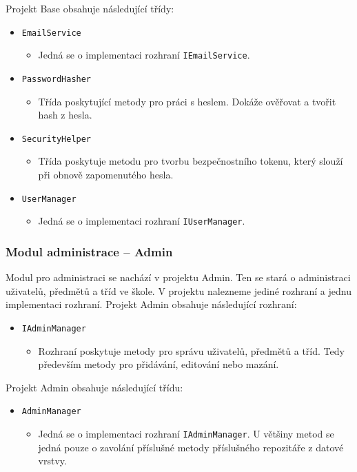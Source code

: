 Projekt Base obsahuje následující třídy:
\begin{itemize}
    \item \texttt{EmailService}
    \begin{itemize}
        \item Jedná se o implementaci rozhraní \texttt{IEmailService}.
    \end{itemize}
    
    \item \texttt{PasswordHasher}
    \begin{itemize}
        \item Třída poskytující metody pro práci s heslem. Dokáže ověřovat a tvořit hash z hesla.
    \end{itemize}
    
    \item \texttt{SecurityHelper}
    \begin{itemize}
        \item Třída poskytuje metodu pro tvorbu bezpečnostního tokenu, který slouží při obnově zapomenutého hesla.
    \end{itemize}
    
    \item \texttt{UserManager}
    \begin{itemize}
        \item Jedná se o implementaci rozhraní \texttt{IUserManager}.
    \end{itemize}
\end{itemize}


\subsubsection{Modul administrace -- Admin}
Modul pro administraci se nachází v projektu Admin. Ten se stará o administraci uživatelů, předmětů a tříd ve škole. V projektu nalezneme jediné rozhraní a jednu implementaci rozhraní. Projekt Admin obsahuje následující rozhraní:
\begin{itemize}
    \item \texttt{IAdminManager}
    \begin{itemize}
        \item Rozhraní poskytuje metody pro správu uživatelů, předmětů a tříd. Tedy především metody pro přidávání, editování nebo mazání. 
    \end{itemize}
\end{itemize}

Projekt Admin obsahuje následující třídu:
\begin{itemize}
    \item \texttt{AdminManager}
    \begin{itemize}
        \item Jedná se o implementaci rozhraní \texttt{IAdminManager}. U většiny metod se jedná pouze o zavolání příslušné metody příslušného repozitáře z datové vrstvy.
    \end{itemize}
\end{itemize}

